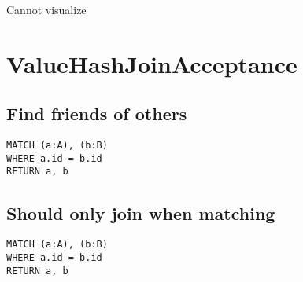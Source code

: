 Cannot visualize
\section{ValueHashJoinAcceptance}

\subsection{Find friends of others}

\begin{lstlisting}
MATCH (a:A), (b:B)
WHERE a.id = b.id
RETURN a, b
\end{lstlisting}

\subsection{Should only join when matching}

\begin{lstlisting}
MATCH (a:A), (b:B)
WHERE a.id = b.id
RETURN a, b
\end{lstlisting}

